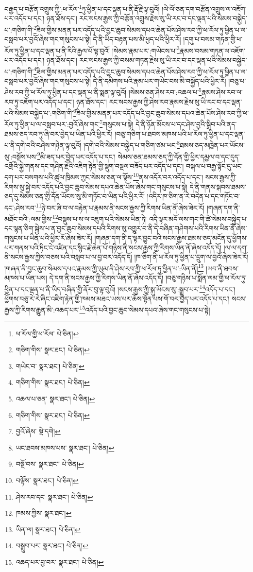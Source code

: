 བརྒྱད་པ་བརྩོན་འགྲུས་ཀྱི་:ཕ་རོལ་\footnote{ཕ་རོལ་གྱི་ཕ་རོལ་  པེ་ཅིན། }ཏུ་ཕྱིན་པ་དང་ལྡན་པ་ནི་རྡོ་རྗེ་ལྟ་བུའོ། །ལེ་ལོ་ཅན་དག་བརྩོན་འགྲུས་ལ་འཇོག་པར་འདོད་པ་དང་། ཉན་ཐོས་དང་། རང་སངས་རྒྱས་ཀྱི་བརྩོན་འགྲུས་རྗེས་སུ་ཡི་རང་བ་དང་ལྡན་པའི་སེམས་བསྐྱེད་པ་:གཅིག་གི་\footnote{གཅིག་གིས་  སྣར་ཐང་།  པེ་ཅིན། }ཟིལ་གྱིས་མནན་པར་འདོད་པའི་བྱང་ཆུབ་སེམས་དཔའ་ཆེན་པོས་ཤེས་རབ་ཀྱི་ཕ་རོལ་ཏུ་ཕྱིན་པ་ལ་བསླབ་པར་བྱའོ་ཞེས་གང་གསུངས་པ་སྟེ། དེ་ནི་ཡིད་བརྟན་པས་མི་ཕྱད་པའི་ཕྱིར་རོ། །དགུ་པ་བསམ་གཏན་གྱི་ཕ་རོལ་ཏུ་ཕྱིན་པ་དང་ལྡན་པ་ནི་རིའི་རྒྱལ་པོ་ལྟ་བུའོ། །སེམས་རྣམ་པར་:གཡེངས་པ་\footnote{གཡེང་བ་  སྣར་ཐང་།  པེ་ཅིན། }རྣམས་བསམ་གཏན་ལ་འཇོག་པར་འདོད་པ་དང་། ཉན་ཐོས་དང་། རང་སངས་རྒྱས་ཀྱི་བསམ་གཏན་རྗེས་སུ་ཡི་རང་བ་དང་ལྡན་པའི་སེམས་བསྐྱེད་པ་:གཅིག་གི་\footnote{གཅིག་གིས་  སྣར་ཐང་།  པེ་ཅིན། }ཟིལ་གྱིས་མནན་པར་འདོད་པའི་བྱང་ཆུབ་སེམས་དཔའ་ཆེན་པོས་ཤེས་རབ་ཀྱི་ཕ་རོལ་ཏུ་ཕྱིན་པ་ལ་བསླབ་པར་བྱའོ་ཞེས་གང་གསུངས་པ་སྟེ། དེ་ནི་དམིགས་པའི་རྣམ་པར་གཡེང་བས་མི་བསྐྱོད་པའི་ཕྱིར་རོ། །བཅུ་པ་ཤེས་རབ་ཀྱི་ཕ་རོལ་ཏུ་ཕྱིན་པ་དང་ལྡན་པ་ནི་སྨན་ལྟ་བུའོ། །སེམས་ཅན་ཤེས་རབ་:འཆལ་པ་\footnote{འཆལ་པ་ཅན་  སྣར་ཐང་།  པེ་ཅིན། }རྣམས་ཤེས་རབ་ལ་རབ་ཏུ་འཇོག་པར་འདོད་པ་དང་། ཉན་ཐོས་དང་། རང་སངས་རྒྱས་ཀྱི་ཤེས་རབ་རྣམས་རྗེས་སུ་ཡི་རང་བ་དང་ལྡན་པའི་སེམས་བསྐྱེད་པ་:གཅིག་གི་\footnote{གཅིག་གིས་  སྣར་ཐང་།  པེ་ཅིན། }ཟིལ་གྱིས་མནན་པར་འདོད་པའི་བྱང་ཆུབ་སེམས་དཔའ་ཆེན་པོས་ཤེས་རབ་ཀྱི་ཕ་རོལ་ཏུ་ཕྱིན་པ་ལ་བསླབ་པར་:བྱའོ་ཞེས་གང་\footnote{བྱའོ་ཞེས་  སྡེ་དགེ། }གསུངས་པ་སྟེ། དེ་ནི་ཉོན་མོངས་པ་དང་ཤེས་བྱའི་སྒྲིབ་པའི་ནད་ཐམས་ཅད་རབ་ཏུ་ཞི་བར་བྱེད་པ་ཡིན་པའི་ཕྱིར་རོ། །བཅུ་གཅིག་པ་ཐབས་མཁས་པའི་ཕ་རོལ་ཏུ་ཕྱིན་པ་དང་ལྡན་པ་ནི་དགེ་བའི་བཤེས་གཉེན་ལྟ་བུའོ། །དགེ་བའི་སེམས་བསྐྱེད་པ་གཅིག་ཙམ་ཡང་\footnote{ཡང་ཐབས་མཁས་པས་  སྣར་ཐང་།  པེ་ཅིན། }ཐམས་ཅད་མཁྱེན་པར་ཡོངས་སུ་:བསྔོས་པས་\footnote{བསྔོ་བས་  སྣར་ཐང་།  པེ་ཅིན། }མི་ཟད་པར་བྱེད་པར་འདོད་པ་དང་། སེམས་ཅན་ཐམས་ཅད་ཀྱི་དོན་གྱི་ཕྱིར་དམྱལ་བ་དང་དུད་འགྲོའི་སྐྱེ་གནས་དང་གཤིན་རྗེའི་འཇིག་རྟེན་གྱི་སྡུག་བསྔལ་བཟོད་པར་འདོད་པ་དང་། བསྐལ་པ་བརྒྱ་སྟོང་དུ་ཡང་དག་པར་བསགས་པའི་ཚུལ་ཁྲིམས་ཀྱང་སེམས་ཅན་ལ་ལྟོས་\footnote{བལྟོས་  སྣར་ཐང་།  པེ་ཅིན། }ནས་འདོར་བར་འདོད་པ་དང་། སངས་རྒྱས་ཀྱི་རིགས་སུ་སྐྱེ་བར་འདོད་པའི་བྱང་ཆུབ་སེམས་དཔའ་ཆེན་པོས་ཞེས་གང་གསུངས་པ་སྟེ། དེ་ནི་གནས་སྐབས་ཐམས་ཅད་དུ་སེམས་ཅན་གྱི་དོན་ཡོངས་སུ་མི་གཏོང་བ་ཡིན་པའི་ཕྱིར་རོ། །འདིར་ཁ་ཅིག་ན་རེ་བདེན་པ་དང་གཏོང་བ་དང་:ཤེས་རབ་\footnote{ཤེས་རབ་དང་  སྣར་ཐང་།  པེ་ཅིན། }ཉེ་བར་ཞི་བ་ལ་བརྟེན་པ་རྣམས་ནི་སངས་རྒྱས་ཀྱི་རིགས་ཡིན་ནོ་ཞེས་ཟེར་རོ། །གཞན་དག་ནི་མཐོང་བའི་:ལམ་གྱིས་\footnote{ཁམས་ཀྱིས་  སྣར་ཐང་། }བསྡུས་པ་ས་ལ་འཇུག་པའི་སེམས་ཡིན་ཏེ། འདི་ལྟར་མདོ་ལས་གང་གི་ཚེ་སེམས་བསྐྱེད་པ་དང་ལྷན་ཅིག་སྐྱེས་པ་ན་བྱང་ཆུབ་སེམས་དཔའི་རིགས་སུ་འགྱུར་བ་ནི་དེ་བཞིན་གཤེགས་པའི་རིགས་ཡིན་ནོ་ཞེས་གསུངས་པ་ཡིན་པའི་ཕྱིར་རོ་ཞེས་ཟེར་རོ། །གཞན་དག་ནི་ད་ལྟར་བྱུང་བའི་སངས་རྒྱས་ཐམས་ཅད་མངོན་དུ་ཕྱོགས་པར་གནས་པའི་ཏིང་ངེ་འཛིན་དང་སྙིང་རྗེ་ཆེན་པོ་གཉིས་ནི་སངས་རྒྱས་ཀྱི་རིགས་ཡིན་ནོ་ཞེས་འདོད་དོ། །ལ་ལ་དག་ནི་སངས་རྒྱས་ཀྱིས་བཅས་པའི་བསླབ་པ་ལ་བྱ་བར་འདོད་དོ། །ཁ་ཅིག་ནི་ཕ་རོལ་ཏུ་ཕྱིན་པ་དྲུག་ལ་བྱའོ་ཞེས་ཟེར་རོ། །གཞན་ནི་བྱང་ཆུབ་སེམས་དཔའ་རྣམས་ཀྱི་ཡུམ་ནི་ཤེས་རབ་ཀྱི་ཕ་རོལ་ཏུ་ཕྱིན་པ་:ཡིན་ནོ།\footnote{ཡིན་ལ།  སྣར་ཐང་།  པེ་ཅིན། } །ཡབ་ནི་ཐབས་མཁས་པ་ཡིན་པས། དེ་དག་ནི་སངས་རྒྱས་ཀྱི་རིགས་ཡིན་ནོ་ཞེས་འདོད་དོ། །བཅུ་གཉིས་པ་སྨོན་ལམ་གྱི་ཕ་རོལ་ཏུ་ཕྱིན་པ་དང་ལྡན་པ་ནི་ཡིད་བཞིན་གྱི་ནོར་བུ་ལྟ་བུའོ། །སངས་རྒྱས་ཀྱི་སྐུ་ཡོངས་སུ་:སྒྲུབ་པར་\footnote{བསྒྲུབ་པར་  སྣར་ཐང་།  པེ་ཅིན། }འདོད་པ་དང་། ཕྱོགས་བཅུ་རེ་རེ་ཞིང་འཇིག་རྟེན་གྱི་ཁམས་མཐའ་ཡས་པར་ཆོས་སྟོན་པས་གོ་བར་བྱེད་པར་འདོད་པ་དང་། སངས་རྒྱས་ཀྱི་རིགས་རྒྱུན་མི་:འཆད་པར་\footnote{འཆད་པར་བྱ་བར་  སྣར་ཐང་།  པེ་ཅིན། }འདོད་པའི་བྱང་ཆུབ་སེམས་དཔའ་ཞེས་གང་གསུངས་པ་སྟེ། 
